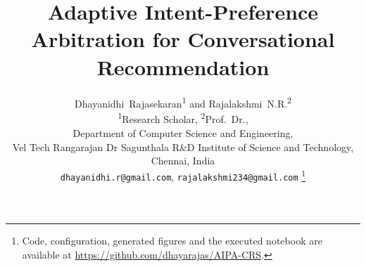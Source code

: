 
\title{Adaptive Intent-Preference Arbitration for Conversational Recommendation}

\author{Dhayanidhi~Rajasekaran\textsuperscript{1} and Rajalakshmi~N.R.\textsuperscript{2}\\[3pt]
{\normalfont\normalsize \textsuperscript{1}Research Scholar, \textsuperscript{2}Prof.~Dr.,\\
Department of Computer Science and Engineering,\\
Vel Tech Rangarajan Dr Sagunthala R\&D Institute of Science and Technology, Chennai, India\\
\texttt{dhayanidhi.r@gmail.com}, \texttt{rajalakshmi234@gmail.com}}%
\thanks{Code, configuration, generated figures and the executed notebook are available at \url{https://github.com/dhayarajas/AIPA-CRS}.}}


\maketitle

